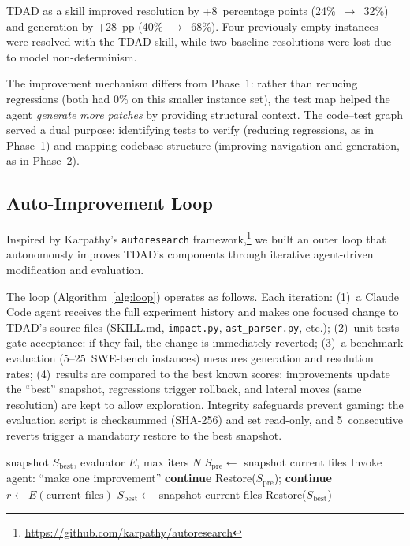 \documentclass[sigconf,nonacm]{acmart}
\begin{document}
\textsc{TDAD} as a skill improved resolution by +8~percentage points
(24\%~$\to$~32\%) and generation by +28~pp (40\%~$\to$~68\%).  Four
previously-empty instances were resolved with the TDAD skill, while two
baseline resolutions were lost due to model non-determinism.

The improvement mechanism differs from Phase~1: rather than reducing
regressions (both had 0\% on this smaller instance set), the test map helped
the agent \emph{generate more patches} by providing structural context.
The code--test graph served a dual purpose: identifying tests to verify
(reducing regressions, as in Phase~1) and mapping codebase structure
(improving navigation and generation, as in Phase~2).

\subsection{Auto-Improvement Loop}
\label{sec:autoloop}

Inspired by Karpathy's \texttt{autoresearch} framework,\footnote{\url{https://github.com/karpathy/autoresearch}}
we built an outer loop that autonomously improves \textsc{TDAD}'s components
through iterative agent-driven modification and evaluation.

The loop (Algorithm~\ref{alg:loop}) operates as follows.  Each iteration:
(1)~a Claude Code agent receives the full experiment history and makes one
focused change to \textsc{TDAD}'s source files (SKILL.md,
\texttt{impact.py}, \texttt{ast\_parser.py}, etc.); (2)~unit tests gate
acceptance: if they fail, the change is immediately reverted;
(3)~a benchmark evaluation (5--25~SWE-bench instances) measures generation
and resolution rates; (4)~results are compared to the best known scores:
improvements update the ``best'' snapshot, regressions trigger rollback,
and lateral moves (same resolution) are kept to allow exploration.
Integrity safeguards prevent gaming: the evaluation script is checksummed
(SHA-256) and set read-only, and 5~consecutive reverts trigger a mandatory
restore to the best snapshot.

\begin{algorithm}[t]
\caption{Auto-improvement loop.}
\label{alg:loop}
\begin{algorithmic}[1]
\Require snapshot $S_\text{best}$, evaluator $E$, max iters $N$
  \State $S_\text{pre} \gets$ snapshot current files
  \State Invoke agent: ``make one improvement''
   \textbf{continue} \EndIf
    \State Restore($S_\text{pre}$); \textbf{continue}
  \EndIf
  \State $r \gets E(\text{current files})$
    \State $S_\text{best} \gets$ snapshot current files
    \State Restore($S_\text{best}$)
  \EndIf {}
\EndFor
\end{algorithmic}
\end{algorithm}
\end{document}
